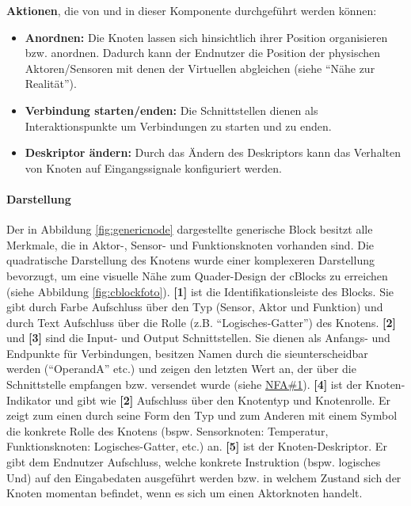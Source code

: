 \textbf{Aktionen}, die von und in dieser Komponente durchgeführt werden können: 
\begin{itemize}
    \item \textbf{Anordnen:} Die Knoten lassen sich hinsichtlich ihrer Position organisieren bzw. anordnen. Dadurch kann der Endnutzer die Position der physischen Aktoren/Sensoren mit denen der Virtuellen abgleichen (siehe "`Nähe zur Realität"').
    \item \textbf{Verbindung starten/enden:} Die Schnittstellen dienen als Interaktionspunkte um Verbindungen zu starten und zu enden.
    \item \textbf{Deskriptor ändern:} Durch das Ändern des Deskriptors kann das Verhalten von Knoten auf Eingangssignale konfiguriert werden.
\end{itemize}

\paragraph{Darstellung} Der in Abbildung \ref{fig:genericnode} dargestellte generische Block besitzt alle Merkmale, die in Aktor-, Sensor- und Funktionsknoten vorhanden sind. Die quadratische Darstellung des Knotens wurde einer komplexeren Darstellung bevorzugt, um eine visuelle Nähe zum Quader-Design der cBlocks zu erreichen (siehe Abbildung \ref{fig:cblockfoto}). \textbf{[1]} ist die Identifikationsleiste des Blocks. Sie gibt durch Farbe Aufschluss über den Typ (\colorbox{sensororange}{Sensor}, \colorbox{aktorgreen}{Aktor} und \colorbox{funcviolet}{Funktion}) und durch Text Aufschluss über die Rolle (z.B. "`Logisches-Gatter"') des Knotens. \textbf{[2]} und \textbf{[3]} sind die Input- und Output Schnittstellen. Sie dienen als Anfangs- und Endpunkte für Verbindungen, besitzen Namen durch die sieunterscheidbar werden ("`OperandA"' etc.) und zeigen den letzten Wert an, der über die Schnittstelle empfangen bzw. versendet wurde (siehe \hyperref[tab:NFA1]{NFA\#1}). \textbf{[4]} ist der Knoten-Indikator und gibt wie \textbf{[2]} Aufschluss über den Knotentyp und Knotenrolle. Er zeigt zum einen durch seine Form den Typ und zum Anderen mit einem Symbol die konkrete Rolle des Knotens (bspw. Sensorknoten: Temperatur, Funktionsknoten: Logisches-Gatter, etc.) an. \textbf{[5]} ist der Knoten-Deskriptor. Er gibt dem Endnutzer Aufschluss, welche konkrete Instruktion (bspw. logisches Und) auf den Eingabedaten ausgeführt werden bzw. in welchem Zustand sich der Knoten momentan befindet, wenn es sich um einen Aktorknoten handelt.

